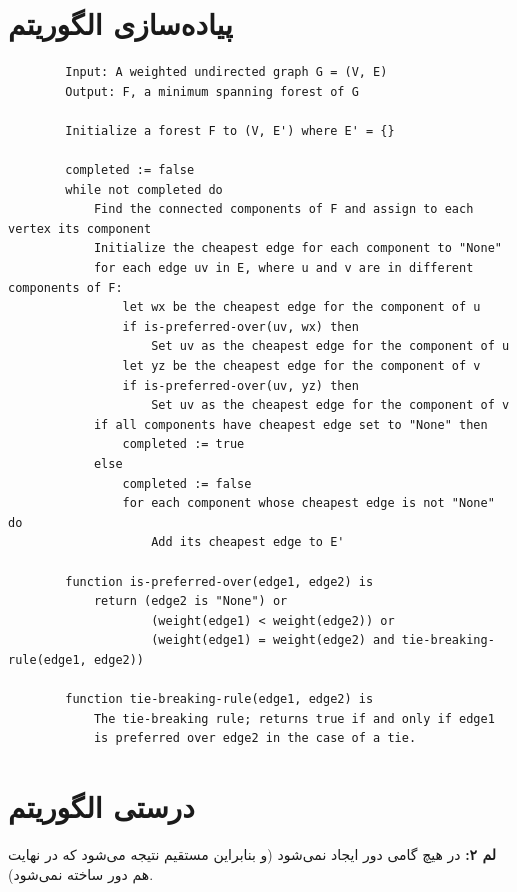 \documentclass[11pt, oneside]{article}
\begin{document}
\pagebreak

\section{پیاده‌سازی الگوریتم}
\begin{latin}
    \begin{verbatim}
        Input: A weighted undirected graph G = (V, E)
        Output: F, a minimum spanning forest of G

        Initialize a forest F to (V, E') where E' = {}

        completed := false
        while not completed do
            Find the connected components of F and assign to each vertex its component
            Initialize the cheapest edge for each component to "None"
            for each edge uv in E, where u and v are in different components of F:
                let wx be the cheapest edge for the component of u
                if is-preferred-over(uv, wx) then
                    Set uv as the cheapest edge for the component of u
                let yz be the cheapest edge for the component of v
                if is-preferred-over(uv, yz) then
                    Set uv as the cheapest edge for the component of v
            if all components have cheapest edge set to "None" then
                completed := true
            else
                completed := false
                for each component whose cheapest edge is not "None" do
                    Add its cheapest edge to E'

        function is-preferred-over(edge1, edge2) is
            return (edge2 is "None") or
                    (weight(edge1) < weight(edge2)) or
                    (weight(edge1) = weight(edge2) and tie-breaking-rule(edge1, edge2))
        
        function tie-breaking-rule(edge1, edge2) is
            The tie-breaking rule; returns true if and only if edge1
            is preferred over edge2 in the case of a tie.
    \end{verbatim}
\end{latin}

\pagebreak
\section{درستی الگوریتم}

\textbf{لم ۲:}
در هیچ گامی دور ایجاد نمی‌شود (و بنابراین مستقیم نتیجه می‌شود که در نهایت هم دور ساخته نمی‌شود).
\end{document}
